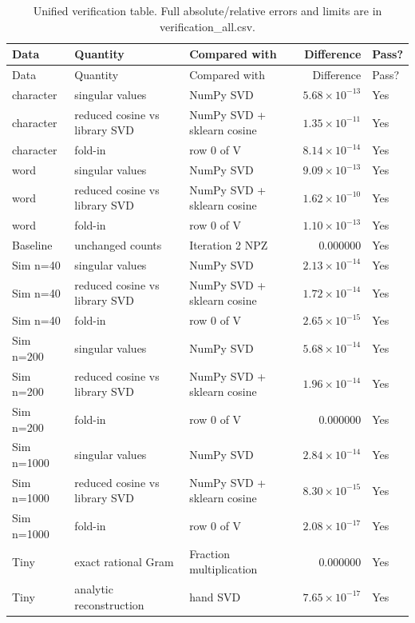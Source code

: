 \documentclass[11pt]{article}
\renewcommand{\arraystretch}{1.15}
\begin{document}
{\small\renewcommand{\arraystretch}{1.05}
\begin{longtable}{p{}p{}p{}rl}
\caption{Unified verification table. Full absolute/relative errors and limits are in verification\_all.csv.}\\
\toprule
Data & Quantity & Compared with & Difference & Pass? \\ \midrule\endfirsthead
\toprule
Data & Quantity & Compared with & Difference & Pass? \\ \midrule\endhead
character & singular values & NumPy SVD & $5.68\times10^{-13}$ & Yes \\
character & reduced cosine vs library SVD & NumPy SVD + sklearn cosine & $1.35\times10^{-11}$ & Yes \\
character & fold-in & row 0 of V & $8.14\times10^{-14}$ & Yes \\
word & singular values & NumPy SVD & $9.09\times10^{-13}$ & Yes \\
word & reduced cosine vs library SVD & NumPy SVD + sklearn cosine & $1.62\times10^{-10}$ & Yes \\
word & fold-in & row 0 of V & $1.10\times10^{-13}$ & Yes \\
Baseline & unchanged counts & Iteration 2 NPZ & 0.000000 & Yes \\
Sim n=40 & singular values & NumPy SVD & $2.13\times10^{-14}$ & Yes \\
Sim n=40 & reduced cosine vs library SVD & NumPy SVD + sklearn cosine & $1.72\times10^{-14}$ & Yes \\
Sim n=40 & fold-in & row 0 of V & $2.65\times10^{-15}$ & Yes \\
Sim n=200 & singular values & NumPy SVD & $5.68\times10^{-14}$ & Yes \\
Sim n=200 & reduced cosine vs library SVD & NumPy SVD + sklearn cosine & $1.96\times10^{-14}$ & Yes \\
Sim n=200 & fold-in & row 0 of V & 0.000000 & Yes \\
Sim n=1000 & singular values & NumPy SVD & $2.84\times10^{-14}$ & Yes \\
Sim n=1000 & reduced cosine vs library SVD & NumPy SVD + sklearn cosine & $8.30\times10^{-15}$ & Yes \\
Sim n=1000 & fold-in & row 0 of V & $2.08\times10^{-17}$ & Yes \\
Tiny & exact rational Gram & Fraction multiplication & 0.000000 & Yes \\
Tiny & analytic reconstruction & hand SVD & $7.65\times10^{-17}$ & Yes \\

\end{longtable}}
\end{document}
